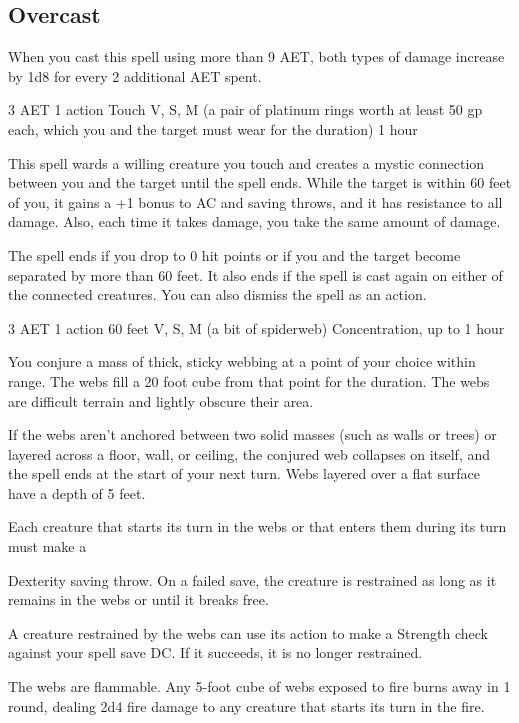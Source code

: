 \subsection*{Overcast} When you cast this spell using more than 9 AET, both types of damage increase by 1d8 for every 2 additional AET spent.

{3 AET}
{1 action}
{Touch}
{V, S, M (a pair of platinum rings worth at least 50 gp each, which you and the target must wear for the duration)}
{1 hour}

This spell wards a willing creature you touch and creates a mystic connection between you and the target until the spell ends. While the target is within 60 feet of you, it gains a +1 bonus to AC and saving throws, and it has resistance to all damage. Also, each time it takes damage, you take the same amount of damage.

The spell ends if you drop to 0 hit points or if you and the target become separated by more than 60 feet. It also ends if the spell is cast again on either of the connected creatures. You can also dismiss the spell as an action.

{3 AET}
{1 action}
{60 feet}
{V, S, M (a bit of spiderweb)}
{Concentration, up to 1 hour}

You conjure a mass of thick, sticky webbing at a point of your choice within range. The webs fill a 20 foot cube from that point for the duration. The webs are difficult terrain and lightly obscure their area.

If the webs aren't anchored between two solid masses (such as walls or trees) or layered across a floor, wall, or ceiling, the conjured web collapses on itself, and the spell ends at the start of your next turn. Webs layered over a flat surface have a depth of 5 feet.

Each creature that starts its turn in the webs or that enters them during its turn must make a

Dexterity saving throw. On a failed save, the creature is restrained as long as it remains in the webs or until it breaks free.

A creature restrained by the webs can use its action to make a Strength check against your spell save DC. If it succeeds, it is no longer restrained.

The webs are flammable. Any 5-foot cube of webs exposed to fire burns away in 1 round, dealing 2d4 fire damage to any creature that starts its turn in the fire.

